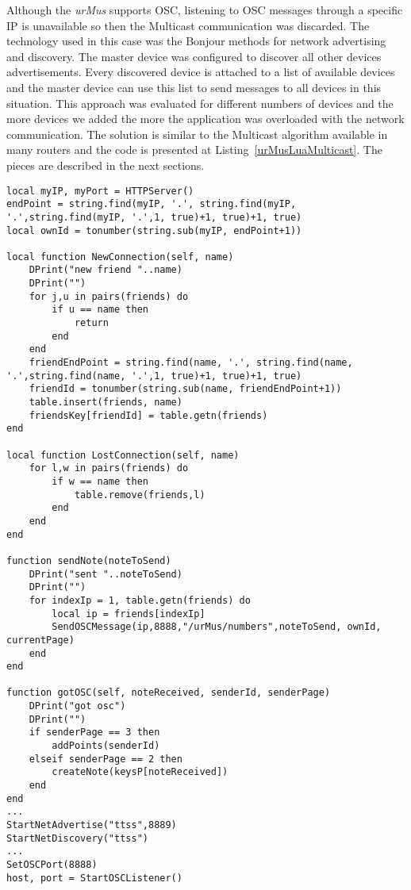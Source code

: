 Although the \textit{urMus} supports OSC, listening to OSC messages through a specific IP is unavailable so then the Multicast communication was discarded.
The technology used in this case was the Bonjour methods for network advertising and discovery.
The master device was configured to discover all other devices advertisements.
Every discovered device is attached to a list of available devices and the master device can use this list to send messages to all devices in this situation.
This approach was evaluated for different numbers of devices and the more devices we added the more the application was overloaded with the network communication.
The solution is similar to the Multicast algorithm available in many routers and the code is presented at Listing~\ref{urMusLuaMulticast}.
The pieces are described in the next sections.

\begin{footnotesize}
\lstset{language=Java, caption=Example of Lua code used at urMus platform for Multicast networking simulation, captionpos=b, label=urMusLuaMulticast, numbers=none, numberstyle=\scriptsize}
\begin{lstlisting}[frame=single]
local myIP, myPort = HTTPServer()
endPoint = string.find(myIP, '.', string.find(myIP,     '.',string.find(myIP, '.',1, true)+1, true)+1, true)
local ownId = tonumber(string.sub(myIP, endPoint+1))

local function NewConnection(self, name)
	DPrint("new friend "..name)
	DPrint("")
	for j,u in pairs(friends) do
		if u == name then
			return
		end
	end
	friendEndPoint = string.find(name, '.', string.find(name, '.',string.find(name, '.',1, true)+1, true)+1, true)
	friendId = tonumber(string.sub(name, friendEndPoint+1))
	table.insert(friends, name)
	friendsKey[friendId] = table.getn(friends)
end

local function LostConnection(self, name)
	for l,w in pairs(friends) do
		if w == name then
			table.remove(friends,l)
		end
	end
end

function sendNote(noteToSend)
	DPrint("sent "..noteToSend)
	DPrint("")
	for indexIp = 1, table.getn(friends) do
		local ip = friends[indexIp]
		SendOSCMessage(ip,8888,"/urMus/numbers",noteToSend, ownId, currentPage)
	end
end

function gotOSC(self, noteReceived, senderId, senderPage)
	DPrint("got osc")
	DPrint("")
	if senderPage == 3 then
		addPoints(senderId)
	elseif senderPage == 2 then
		createNote(keysP[noteReceived])
	end
end
...
StartNetAdvertise("ttss",8889)
StartNetDiscovery("ttss")
...
SetOSCPort(8888)
host, port = StartOSCListener()
\end{lstlisting}
\end{footnotesize}

